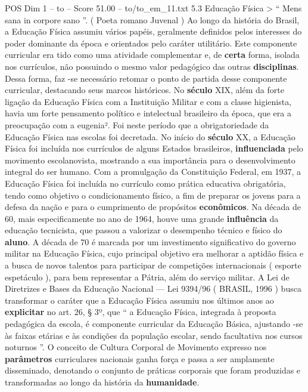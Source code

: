 \begin{textsample}{POS Dim 1 – to – Score 51.00 – to/to\_em\_11.txt}  \label{ex:f1_pos_256}
5.3 Educação Física > “ Mens sana in corpore sano ”. ( Poeta romano Juvenal ) Ao longo da história do Brasil, a Educação Física assumiu vários papéis, geralmente definidos pelos interesses do poder dominante da época e orientados pelo caráter utilitário.
Este componente curricular era tido como uma atividade complementar e, de \textbf{certa} forma, isolada nos currículos, não possuindo o mesmo valor pedagógico das outras \textbf{disciplinas}.
Dessa forma, faz -se necessário retomar o ponto de partida desse componente curricular, destacando seus marcos históricos.
No \textbf{século} XIX, além da forte ligação da Educação Física com a Instituição Militar e com a classe higienista, havia um forte pensamento político e intelectual brasileiro da época, que era a preocupação com a eugenia².
Foi neste período que a obrigatoriedade da Educação Física nas escolas foi decretada.
No início do \textbf{século} XX, a Educação Física foi incluída nos currículos de alguns Estados brasileiros, \textbf{influenciada} pelo movimento escolanovista, mostrando a sua importância para o desenvolvimento integral do ser humano.
Com a promulgação da Constituição Federal, em 1937, a Educação Física foi incluída no currículo como prática educativa obrigatória, tendo como objetivo o condicionamento físico, a fim de preparar os jovens para a defesa da nação e para o cumprimento de propósitos \textbf{econômicos}.
Na década de 60, mais especificamente no ano de 1964, houve uma grande \textbf{influência} da educação tecnicista, que passou a valorizar o desempenho técnico e físico do \textbf{aluno}.
A década de 70 é marcada por um investimento significativo do governo militar na Educação Física, cujo principal objetivo era melhorar a aptidão física e a busca de novos talentos para participar de competições internacionais ( esporte espetáculo ), para bem representar a Pátria, além do serviço militar.
A Lei de Diretrizes e Bases da Educação Nacional — Lei 9394/96 ( BRASIL, 1996 ) busca transformar o caráter que a Educação Física assumiu nos últimos anos ao \textbf{explicitar} no art. 26, § 3º, que “ a Educação Física, integrada à proposta pedagógica da escola, é componente curricular da Educação Básica, ajustando -se às faixas etárias e às condições da população escolar, sendo facultativa nos cursos noturnos ”.
O conceito de Cultura Corporal de Movimento expresso nos \textbf{parâmetros} curriculares nacionais ganha força e passa a ser amplamente disseminado, denotando o conjunto de práticas corporais que foram produzidas e transformadas ao longo da história da \textbf{humanidade}.

\end{textsample}
